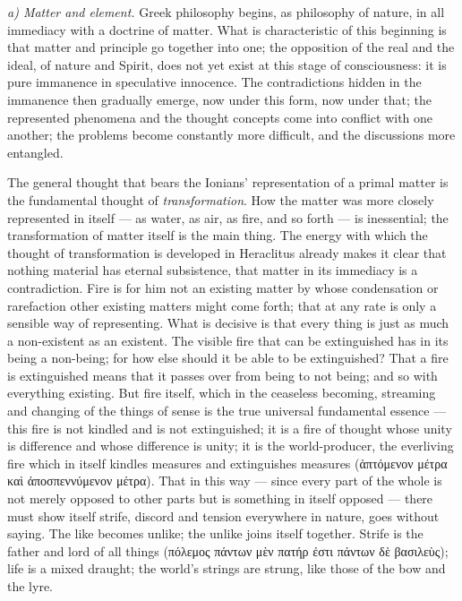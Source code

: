 \documentclass[12pt,a4paper]{book}
\newcommand{\runin}[1]{\emph{#1}\hspace{0.4em}}
\begin{document}
\runin{a) Matter and element.} Greek philosophy begins, as philosophy of nature, in all immediacy with a
doctrine of matter. What is characteristic of this beginning is
that matter and principle go together into one; the opposition of the real and the ideal, of nature and
Spirit, does not yet exist at this stage of consciousness: it is pure immanence in speculative innocence. The
contradictions hidden in the immanence then gradually emerge, now under this form, now under that; the
represented phenomena and the thought concepts come into conflict with one another; the problems become
constantly more difficult, and the discussions more entangled.

The general thought that bears the Ionians' representation of a primal matter is the fundamental thought of
\emph{transformation}. How the matter was more closely represented in itself --- as water, as air, as fire,
and so forth --- is inessential; the transformation of matter itself is the main thing. The energy with which
the thought of transformation is developed in Heraclitus already makes it clear that nothing material has
eternal subsistence, that matter in its immediacy is a contradiction. Fire is for him not an existing matter
by whose condensation or rarefaction other existing matters might come forth; that at any rate is only a
sensible way of representing. What is decisive is that every thing is just as much a non-existent as an
existent. The visible fire that can be extinguished has in its being a non-being; for how else should it be
able to be extinguished? That a fire is extinguished means that it passes over from being to not being; and
so with everything existing. But fire itself, which in the ceaseless becoming, streaming and changing of the
things of sense is the true universal fundamental essence --- this fire is not kindled and is not
extinguished; it is a fire of thought whose unity is difference and whose difference is unity; it is the
world-producer, the everliving fire which in itself
kindles measures and extinguishes measures (ἁπτόμενον μέτρα καὶ ἀποσπεννύμενον μέτρα). That in this way ---
since every part of the whole is not merely opposed to other parts but is something in itself opposed --- there
must show itself strife, discord and tension everywhere in nature, goes without saying. The like becomes
unlike; the
unlike joins itself together. Strife is the father and lord of all things
(πόλεμος πάντων μὲν πατήρ ἐστι πάντων δὲ βασιλεὺς); life is a mixed draught; the world's strings are strung,
like those of the bow and the lyre.
\end{document}

